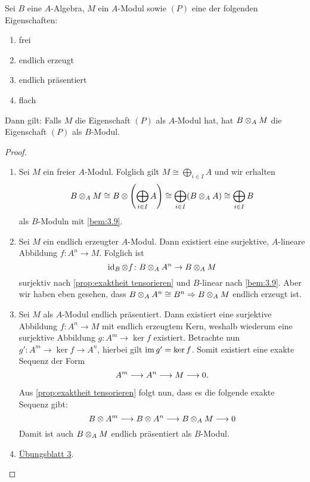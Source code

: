 \documentclass[12pt,a4paper]{scrartcl}
\theoremstyle{cplain}
\theoremstyle{cdef}
\begin{document}
\begin{satz}
	Sei $B$ eine $A$-Algebra, $M$ ein $A$-Modul sowie $(P)$ eine der folgenden Eigenschaften:
	\begin{enumerate}
		\item frei \label{thm:tensorieren erhaelt eigenschaften:i}
		\item endlich erzeugt \label{thm:tensorieren erhaelt eigenschaften:ii}
		\item endlich präsentiert \label{thm:tensorieren erhaelt eigenschaften:iii}
		\item flach \label{thm:tensorieren erhaelt eigenschaften:iv}
	\end{enumerate}	
	Dann gilt: Falls $M$ die Eigenschaft $(P)$ als $A$-Modul hat, hat $B\otimes_AM$ die Eigenschaft $(P)$ als $B$-Modul.
\end{satz}
\begin{proof}
	\leavevmode
	\begin{enumerate}[label=\ref{thm:tensorieren erhaelt eigenschaften:\roman*}]
		\item Sei $M$ ein freier $A$-Modul. Folglich gilt $M \cong \bigoplus_{i\in I}A$ und wir erhalten \[B\otimes_AM\cong B\otimes \left(\bigoplus_{i\in I}A\right) \cong \bigoplus_{i\in I}(B\otimes_A A) \cong \bigoplus_{i\in I} B\] als $B$-Moduln mit \cref{bem:3.9}.
		\item Sei $M$ ein endlich erzeugter $A$-Modul. Dann existiert eine surjektive, $A$-lineare Abbildung $f\colon A^n\to M$. Folglich ist
		\[\operatorname{id}_B\otimes f\colon B\otimes_AA^n\to B\otimes_AM\] surjektiv nach \cref{prop:exaktheit tensorieren} und $B$-linear nach \cref{bem:3.9}. Aber wir haben eben gesehen, dass $B\otimes_AA^n \cong B^n\Rightarrow B\otimes_AM$ endlich erzeugt ist.
		\item Sei $M$ als $A$-Modul endlich präsentiert. Dann existiert eine surjektive Abbildung $f\colon A^n \to M$ mit endlich erzeugtem Kern, weshalb wiederum eine surjektive Abbildung $g\colon A^m \to \ker f$ existiert. Betrachte nun $g'\colon A^m \to \ker f \to A^n$, hierbei gilt $\operatorname{im} g' = \operatorname{ker} f$. Somit existiert eine exakte Sequenz der Form
		\[ A^m \longrightarrow A^n \longrightarrow M\longrightarrow 0. \]
		
		Aus \cref{prop:exaktheit tensorieren} folgt nun, dass es die folgende exakte Sequenz gibt:
		\[B\otimes A^m \longrightarrow B\otimes A^n \longrightarrow B\otimes_AM\longrightarrow 0\]
		Damit ist auch $B\otimes_AM$ endlich präsentiert als $B$-Modul.
		\item \href{http://www.math.uni-bonn.de/ag/stroppel/Franzen_Algebra_1_Uebung/Blatt3.pdf}{Übungsblatt 3}.
		\qedhere
	\end{enumerate}
\end{proof}
\end{document}
